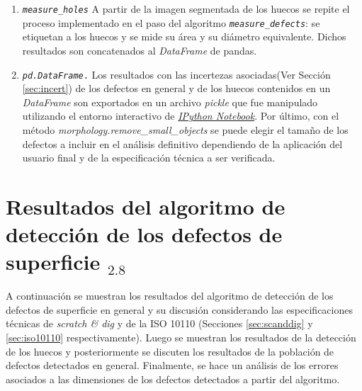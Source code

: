 \begin{enumerate}
\item \texttt{\textit{measure\_holes}} A partir de la imagen segmentada de los huecos se repite el proceso implementado en el paso del algoritmo \texttt{\textit{measure\_defects}}: se etiquetan a los huecos y se mide su área y su diámetro equivalente. Dichos resultados son concatenados al \textit{DataFrame} de pandas.
\item \texttt{\textit{pd.DataFrame}.} Los resultados con las incertezas asociadas(Ver Sección \ref{sec:incert}) de los defectos en general y de los huecos contenidos en un \textit{DataFrame} son exportados en un archivo \textit{pickle} que fue manipulado utilizando el entorno interactivo de \href{https://ipython.org/notebook.html}{\textit{IPython Notebook}}. Por último, con el método \textit{morphology.remove\_small\_objects} se puede elegir el tamaño de los defectos a incluir en el análisis definitivo dependiendo de la aplicación del usuario final y de la especificación técnica a ser verificada.
\end{enumerate}


\singlespacing
\section{Resultados del algoritmo de detección de los defectos de superficie \href{https://github.com/jrr1984/defects_analysis/blob/master/Defects\%20analysis.ipynb}{\faGithub$_{2.8}$}}
\label{sec:resgrl}


\hspace{0.5cm}A continuación se muestran los resultados del algoritmo de detección de los defectos de superficie en general y su discusión considerando las especificaciones técnicas de \textit{scratch \& dig} y de la ISO 10110 (Secciones \ref{sec:scanddig} y \ref{sec:iso10110} respectivamente). Luego se muestran los resultados de la detección de los huecos y posteriormente se discuten los resultados de la población de defectos detectados en general. Finalmente, se hace un análisis de los errores asociados a las dimensiones de los defectos detectados a partir del algoritmo.

\singlespacing
